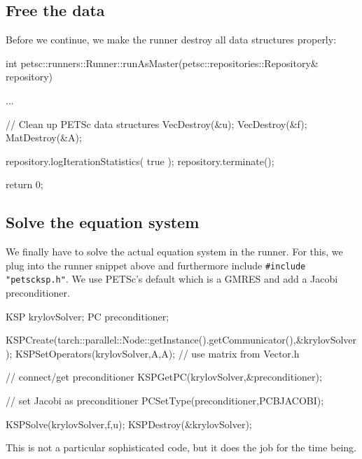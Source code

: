 \subsection{Free the data}

Before we continue, we make the runner
destroy all data structures properly:

\begin{code}
int petsc::runners::Runner::runAsMaster(petsc::repositories::Repository& repository) {
  ...
  
  // Clean up PETSc data structures
  VecDestroy(&u);
  VecDestroy(&f);
  MatDestroy(&A);

  repository.logIterationStatistics( true );
  repository.terminate();

  return 0;
}
\end{code}



\subsection{Solve the equation system}


We finally have to solve the actual equation system in the runner. For this, we
plug into the runner snippet above and furthermore include
\texttt{\#include "petscksp.h"}. We use PETSc's default which is a GMRES
and add a Jacobi preconditioner.

\begin{code}
KSP krylovSolver;
PC  preconditioner;

KSPCreate(tarch::parallel::Node::getInstance().getCommunicator(),&krylovSolver);
KSPSetOperators(krylovSolver,A,A); // use matrix from Vector.h

// connect/get preconditioner
KSPGetPC(krylovSolver,&preconditioner);

// set Jacobi as preconditioner
PCSetType(preconditioner,PCBJACOBI);

KSPSolve(krylovSolver,f,u);
KSPDestroy(&krylovSolver);
\end{code}

\noindent
This is not a particular sophisticated code, but it does the job for the time
being.

